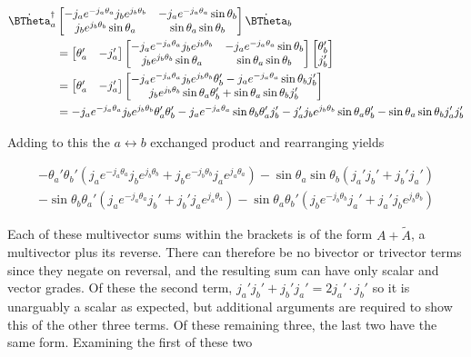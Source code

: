 \begin{align*}
{\dot{\BTheta}_a}^\dagger
&\begin{bmatrix}
- j_a e^{-j_a \theta_a} j_b e^{j_b\theta_b} & - j_a e^{-j_a \theta_a} \sin\theta_b \\
j_b e^{j_b \theta_b} \sin\theta_a & \sin\theta_a \sin\theta_b
\end{bmatrix}
\dot{\BTheta}_b \\
&=
\begin{bmatrix}
\theta_a' & -j_a'
\end{bmatrix}
\begin{bmatrix}
- j_a e^{-j_a \theta_a} j_b e^{j_b\theta_b} & - j_a e^{-j_a \theta_a} \sin\theta_b \\
j_b e^{j_b \theta_b} \sin\theta_a & \sin\theta_a \sin\theta_b
\end{bmatrix}
\begin{bmatrix}
\theta_b' \\
j_b'
\end{bmatrix} \\
&=
\begin{bmatrix}
\theta_a' & -j_a'
\end{bmatrix}
\begin{bmatrix}
- j_a e^{-j_a \theta_a} j_b e^{j_b\theta_b} \theta_b' - j_a e^{-j_a \theta_a} \sin\theta_b j_b' \\
j_b e^{j_b \theta_b} \sin\theta_a \theta_b' + \sin\theta_a \sin\theta_b j_b'
\end{bmatrix} \\
&=
- j_a e^{-j_a \theta_a} j_b e^{j_b\theta_b} \theta_a' \theta_b' - j_a e^{-j_a \theta_a} \sin\theta_b \theta_a' j_b' -j_a' j_b e^{j_b \theta_b} \sin\theta_a \theta_b' - \sin\theta_a \sin\theta_b j_a' j_b'
\end{align*}

Adding to this the $a \leftrightarrow b$ exchanged product and rearranging yields

\begin{align*}
- \theta_a' \theta_b' (j_a e^{-j_a \theta_a} j_b e^{j_b\theta_b} + j_b e^{-j_b \theta_b} j_a e^{j_a\theta_a} ) - \sin\theta_a \sin\theta_b (j_a' j_b' + j_b' j_a') \\
- \sin\theta_b \theta_a' ( j_a e^{-j_a \theta_a} j_b' + j_b' j_a e^{j_a \theta_a} )
- \sin\theta_a \theta_b' ( j_b e^{-j_b \theta_b} j_a' + j_a' j_b e^{j_b \theta_b} )
\end{align*}

Each of these multivector sums within the brackets is of the form $A + \tilde{A}$, a multivector plus its reverse.  There can therefore be no bivector or trivector terms since they negate on reversal, and the resulting sum can have only scalar and vector grades.  Of these the second term, $j_a' j_b' + j_b' j_a' = 2 j_a' \cdot j_b'$ so it is unarguably a scalar as expected, but additional arguments are required to show this of the other three terms.  Of these remaining three, the last two have the same form.  Examining the first of these two

